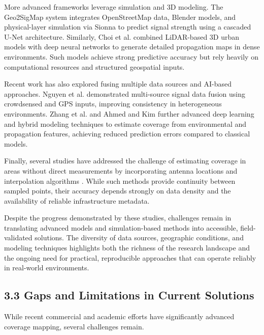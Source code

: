 \documentclass[11pt]{article}
\begin{document}
More advanced frameworks leverage simulation and 3D modeling. The
Geo2SigMap system \cite{li2023} integrates OpenStreetMap data, Blender
models, and physical-layer simulation via Sionna to predict signal
strength using a cascaded U-Net architecture. Similarly, Choi et al.
\cite{choi2022} combined LiDAR-based 3D urban models with deep neural
networks to generate detailed propagation maps in dense environments.
Such models achieve strong predictive accuracy but rely heavily on
computational resources and structured geospatial inputs.

Recent work has also explored fusing multiple data sources and AI-based
approaches. Nguyen et al. \cite{nguyen2023} demonstrated multi-source
signal data fusion using crowdsensed and GPS inputs, improving
consistency in heterogeneous environments. Zhang et al. \cite{zhang2023}
and Ahmed and Kim \cite{ahmed2022} further advanced deep learning and
hybrid modeling techniques to estimate coverage from environmental and
propagation features, achieving reduced prediction errors compared to
classical models.

Finally, several studies have addressed the challenge of estimating
coverage in areas without direct measurements by incorporating antenna
locations and interpolation algorithms \cite{shepard1968}. While such
methods provide continuity between sampled points, their accuracy
depends strongly on data density and the availability of reliable
infrastructure metadata.

Despite the progress demonstrated by these studies, challenges remain in
translating advanced models and simulation-based methods into accessible,
field-validated solutions. The diversity of data sources, geographic
conditions, and modeling techniques highlights both the richness of the
research landscape and the ongoing need for practical, reproducible
approaches that can operate reliably in real-world environments.

\hypertarget{gaps-and-limitations-in-current-solutions}{%
\subsection{3.3 Gaps and Limitations in Current
Solutions}\label{gaps-and-limitations-in-current-solutions}}

While recent commercial and academic efforts have significantly advanced
coverage mapping, several challenges remain.
\end{document}
